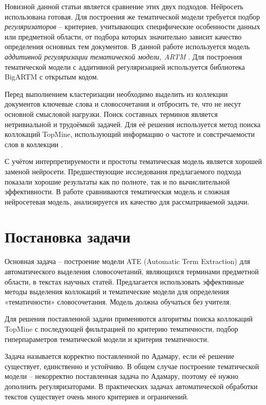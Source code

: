 \documentclass[a4paper, 12pt]{article}
\begin{document}
        Новизной данной статьи является сравнение этих двух подходов. Нейросеть использована готовая. 
        Для построения же тематической модели требуется подбор \textit{регуляризаторов} -- критериев, учитывающих специфические особенности данных или предметной области, от подбора которых значительно зависит качество определения основных тем документов. В данной работе используется модель \textit{аддитивной регуляризации тематической модели, ARTM} \citep{vorontsov2020}. Для построения тематической модели с аддитивной регуляризацией используется библиотека BigARTM \citep{Vorontsov2015} с открытым кодом.

        Перед выполнением кластеризации необходимо выделить из коллекции документов ключевые слова и словосочетания и отбросить те, что не несут основной смысловой нагрузки. Поиск составных терминов является нетривиальной и трудоёмкой задачей. Для её решения используется метод поиска коллокаций TopMine, использующий информацию о частоте и совстречаемости слов в коллекции \citep{shatalov2019}.


        С учётом интерпретируемости и простоты тематическая модель является хорошей заменой нейросети. Предшествующие исследования предлагаемого подхода показали хорошие результаты как по полноте, так и по вычислительной эффективности. В работе сравниваются тематическая модель и сложная нейросетевая модель, анализируется их качество для рассматриваемой задачи.

\section{Постановка задачи}

        Основная задача -- построение модели ATE (Automatic Term Extraction) для автоматического выделения словосочетаний, являющихся терминами предметной области, в текстах научных статей. Предлагается использовать эффективные методы выделения коллокаций и тематические модели для определения «тематичности» словосочетания. Модель должна обучаться без учителя.

        Для решения поставленной задачи применяются алгоритмы поиска коллокаций TopMine с последующей фильтрацией по критерию тематичности, подбор гиперпараметров тематической модели и критерия тематичности.

        Задача называется корректно поставленной по Адамару, если её решение существует, единственно и устойчиво. В общем случае построение тематической модели – некорректно поставленная задача по Адамару, поэтому её нужно дополнить регуляризаторами. В практических задачах автоматической обработки текстов существует очень много критериев и ограничений.
\end{document}
